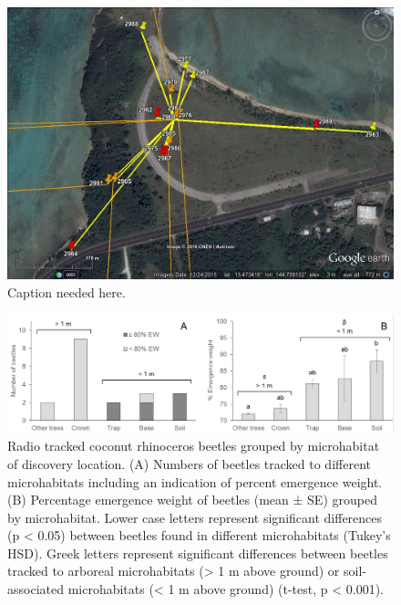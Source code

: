 \documentclass[11pt,letterpaper]{scrartcl}
\begin{document}
\begin{figure}[p]
\includegraphics[width=\textwidth]{asan_tracks.jpg}
\caption{\label{fig:asan_tracks}Caption needed here.}
\end{figure}

\begin{figure}[p]
\includegraphics[width=\textwidth]{statsfig.png}
\caption{\label{fig:statsfig}Radio tracked coconut rhinoceros beetles grouped by microhabitat of discovery location. (A) Numbers of beetles tracked to different microhabitats including an indication of percent emergence weight.  (B) Percentage emergence weight of beetles (mean ± SE) grouped by microhabitat.  Lower case letters represent significant differences (p < 0.05) between beetles found in different microhabitats (Tukey’s HSD).  Greek letters represent significant differences between beetles tracked to arboreal microhabitats (> 1 m above ground) or soil-associated microhabitats (< 1 m above ground) (t-test, p < 0.001).}
\end{figure}

\begin{table}[p]

\end{table}
\end{document}

